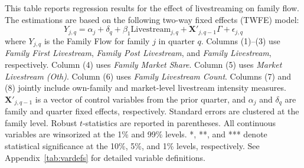 \begin{table}[!ht]
    \centering
    
    \caption{Dynamic Livestream Effect on Family Flow}\label{tab:family_twfe_flow_reallocation}
    
    \begin{minipage}{0.95\textwidth}
        \footnotesize
        This table reports regression results for the effect of livestreaming on family flow. The estimations are based on the following two-way fixed effects (TWFE) model:
        \begin{equation*}
            Y_{j,q} = \alpha_j + \delta_q + \beta_1 \text{Livestream}_{j,q} + \mathbf{X}'_{j,q-1} \Gamma + \epsilon_{j,q}
        \end{equation*}
        where $Y_{j,q}$ is the Family Flow for family $j$ in quarter $q$. Columns (1)--(3) use \textit{Family First Livestream}, \textit{Family Post Livestream}, and \textit{Family Livestream}, respectively. Column (4) uses \textit{Family Market Share}. Column (5) uses \textit{Market Livestream (Oth)}. Column (6) uses \textit{Family Livestream Count}. Columns (7) and (8) jointly include own-family and market-level livestream intensity measures. $\mathbf{X}'_{j,q-1}$ is a vector of control variables from the prior quarter, and $\alpha_j$ and $\delta_q$ are family and quarter fixed effects, respectively. Standard errors are clustered at the family level. Robust $t$-statistics are reported in parentheses. All continuous variables are winsorized at the 1\% and 99\% levels. *, **, and *** denote statistical significance at the 10\%, 5\%, and 1\% levels, respectively. See Appendix~\ref{tab:vardefs} for detailed variable definitions. %
    \end{minipage}

    \vspace{2mm}
    \resizebox{\textwidth}{!}{%
     
    }
    
\end{table}
